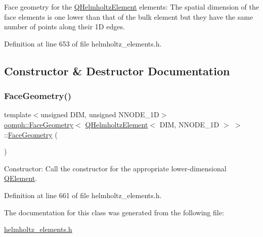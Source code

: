 Face geometry for the \hyperlink{classoomph_1_1QHelmholtzElement}{Q\+Helmholtz\+Element} elements\+: The spatial dimension of the face elements is one lower than that of the bulk element but they have the same number of points along their 1D edges. 

Definition at line 653 of file helmholtz\+\_\+elements.\+h.



\subsection{Constructor \& Destructor Documentation}
\mbox{\label{classoomph_1_1FaceGeometry_3_01QHelmholtzElement_3_01DIM_00_01NNODE__1D_01_4_01_4_a940ed4939121cb42c0f2a8ab839ab10a}} 
\subsubsection{\texorpdfstring{Face\+Geometry()}{FaceGeometry()}}
{\footnotesize\ttfamily template$<$unsigned D\+IM, unsigned N\+N\+O\+D\+E\+\_\+1D$>$ \\
\hyperlink{classoomph_1_1FaceGeometry}{oomph\+::\+Face\+Geometry}$<$ \hyperlink{classoomph_1_1QHelmholtzElement}{Q\+Helmholtz\+Element}$<$ D\+IM, N\+N\+O\+D\+E\+\_\+1D $>$ $>$\+::\hyperlink{classoomph_1_1FaceGeometry}{Face\+Geometry} (\begin{DoxyParamCaption}{ }\end{DoxyParamCaption})\hspace{0.3cm}{\ttfamily [inline]}}



Constructor\+: Call the constructor for the appropriate lower-\/dimensional \hyperlink{classoomph_1_1QElement}{Q\+Element}. 



Definition at line 661 of file helmholtz\+\_\+elements.\+h.



The documentation for this class was generated from the following file\+:\begin{DoxyCompactItemize}
\item 
\hyperlink{helmholtz__elements_8h}{helmholtz\+\_\+elements.\+h}\end{DoxyCompactItemize}
